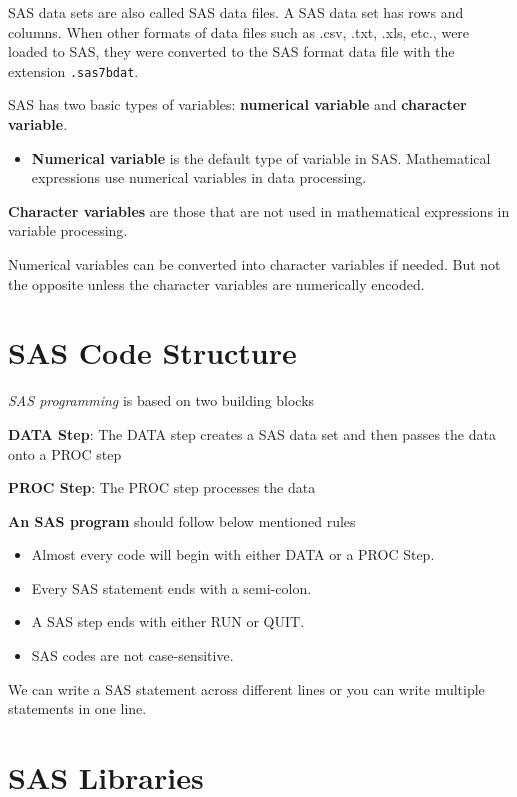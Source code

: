 \documentclass[
]{book}
\providecommand{\tightlist}{%
  \setlength{\itemsep}{0pt}\setlength{\parskip}{0pt}}
\begin{document}
SAS data sets are also called SAS data files. A SAS data set has rows and columns. When other formats of data files such as .csv, .txt, .xls, etc., were loaded to SAS, they were converted to the SAS format data file with the extension \texttt{.sas7bdat}.

SAS has two basic types of variables: \textbf{numerical variable} and \textbf{character variable}.

\begin{itemize}
\tightlist
\item
  \textbf{Numerical variable} is the default type of variable in SAS. Mathematical expressions use numerical variables in data processing.
\end{itemize}

\textbf{Character variables} are those that are not used in mathematical expressions in variable processing.

Numerical variables can be converted into character variables if needed. But not the opposite unless the character variables are numerically encoded.

\hypertarget{sas-code-structure}{%
\section{SAS Code Structure}\label{sas-code-structure}}

\emph{SAS programming} is based on two building blocks

\textbf{DATA Step}: The DATA step creates a SAS data set and then passes the data onto a PROC step

\textbf{PROC Step}: The PROC step processes the data

\textbf{An SAS program} should follow below mentioned rules

\begin{itemize}
\item
  Almost every code will begin with either DATA or a PROC Step.
\item
  Every SAS statement ends with a semi-colon.
\item
  A SAS step ends with either RUN or QUIT.
\item
  SAS codes are not case-sensitive.
\end{itemize}

We can write a SAS statement across different lines or you can write multiple statements in one line.

\hypertarget{sas-libraries}{%
\section{SAS Libraries}\label{sas-libraries}}
\end{document}
